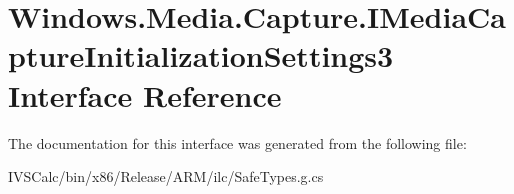 \hypertarget{interface_windows_1_1_media_1_1_capture_1_1_i_media_capture_initialization_settings3}{}\section{Windows.\+Media.\+Capture.\+I\+Media\+Capture\+Initialization\+Settings3 Interface Reference}
\label{interface_windows_1_1_media_1_1_capture_1_1_i_media_capture_initialization_settings3}


The documentation for this interface was generated from the following file\+:\begin{DoxyCompactItemize}
\item 
I\+V\+S\+Calc/bin/x86/\+Release/\+A\+R\+M/ilc/Safe\+Types.\+g.\+cs\end{DoxyCompactItemize}
